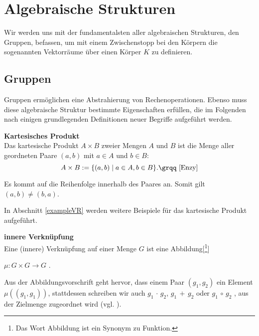 \chapter{Algebraische Strukturen}
\label{sec:Algebraische Strukturen}
Wir werden uns mit der fundamentalsten aller algebraischen Strukturen, den Gruppen, befassen, um mit einem Zwischenstopp bei den Körpern die sogenannten Vektorräume über einen Körper $K$ zu definieren.
\section{Gruppen}
\label{sec:Gruppen}
Gruppen ermöglichen eine Abstrahierung von Rechenoperationen. Ebenso muss diese algebraische Struktur bestimmte Eigenschaften erfüllen, die im Folgenden nach einigen grundlegenden Definitionen neuer Begriffe aufgeführt werden.

\theoremstyle{definition}
\begin{definition}{\textbf{Kartesisches Produkt}}
	\\{\glqq}Das kartesische Produkt $A\times B$ zweier Mengen $A$ und $B$ ist die Menge aller geordneten Paare $(a,b)$ mit $a \in A$ und $b \in B$: \[A \times B := \{(a,b) \mid a \in A, b \in B\} \text{.{\grqq} \cite[S. 28]{Enzy}}\]
\end{definition}

\theoremstyle{bem}
\begin{bem}{}
Es kommt auf die Reihenfolge innerhalb des Paares an. Somit gilt $(a,b) \not= (b,a)$.
\end{bem}
In Abschnitt \ref{exampleVR} werden weitere Beispiele für das kartesische Produkt aufgeführt.

\theoremstyle{definition}
\begin{definition}{\textbf{innere Verknüpfung}}
	\\{\glqq}Eine (innere) Verknüpfung auf einer Menge $G$ ist eine Abbildung[\footnote{Das Wort Abbildung ist ein Synonym zu Funktion.}]
\begin{center}
$\mu: G \times G \rightarrow G $ .{\grqq} \cite[S. 19, 4.1]{Skript}
\end{center}
\end{definition}

\theoremstyle{bem}
\begin{bem}{}
Aus der Abbildungsvorschrift geht hervor, dass einem Paar $(g_1,g_2)$ ein Element $\mu((g_1,g_1))$, {\textendash} stattdessen schreiben wir auch $g_1 \, \cdot \, g_2$, $g_1 \, + \, g_2$ oder $g_1 \, \circ \, g_2$ {\textendash}, aus der Zielmenge zugeordnet wird (vgl. \cite[S. 19, 4.1]{Skript}).
\end{bem}


